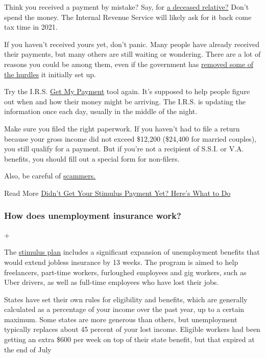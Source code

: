 Think you received a payment by mistake? Say, for
\href{https://www.nytimes.com/2020/06/25/us/politics/coronavirus-stimulus-dead-people.html}{a
deceased relative?} Don't spend the money. The Internal Revenue Service
will likely ask for it back come tax time in 2021.

If you haven't received yours yet, don't panic. Many people have already
received their payments, but many others are still waiting or wondering.
There are a lot of reasons you could be among them, even if the
government has
\href{https://www.nytimes.com/2020/04/01/business/coronavirus-stimulus-social-security.html}{removed
some of the hurdles} it initially set up.

Try the I.R.S. \href{https://www.irs.gov/coronavirus/get-my-payment}{Get
My Payment} tool again. It's supposed to help people figure out when and
how their money might be arriving. The I.R.S. is updating the
information once each day, usually in the middle of the night.

Make sure you filed the right paperwork. If you haven't had to file a
return because your gross income did not exceed \$12,200 (\$24,400 for
married couples), you still qualify for a payment. But if you're not a
recipient of S.S.I. or V.A. benefits, you should fill out a special form
for non-filers.

Also, be careful of
\href{https://www.nytimes.com/2020/04/22/technology/stimulus-checks-hackers-coronavirus.html}{scammers.}

 Read More
\href{https://www.nytimes.com/article/where-is-my-stimulus-payment.html}{Didn't
Get Your Stimulus Payment Yet? Here's What to Do}

\hypertarget{how-does-unemployment-insurance-work}{%
\subsubsection{How does unemployment insurance
work?}\label{how-does-unemployment-insurance-work}}

+

The
\href{https://www.nytimes.com/2020/03/25/us/politics/whats-in-coronavirus-stimulus-bill.html}{stimulus
plan} includes a significant expansion of unemployment benefits that
would extend jobless insurance by 13 weeks. The program is aimed to help
freelancers, part-time workers, furloughed employees and gig workers,
such as Uber drivers, as well as full-time employees who have lost their
jobs.

States have set their own rules for eligibility and benefits, which are
generally calculated as a percentage of your income over the past year,
up to a certain maximum. Some states are more generous than others, but
unemployment typically replaces about 45 percent of your lost income.
Eligible workers had been getting an extra \$600 per week on top of
their state benefit, but that expired at the end of July

